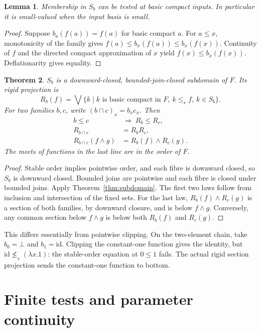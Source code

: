 \documentclass[11pt]{article}
\newtheorem{theorem}{Theorem}[section]
\newtheorem{lemma}[theorem]{Lemma}
\newcommand{\id}{\mathrm{id}}
\begin{document}
\begin{lemma}
Membership in $S_b$ can be tested at basic compact inputs. In particular
it is small-valued when the input basis is small.
\end{lemma}
\begin{proof}
Suppose $b_a(f(a))=f(a)$ for basic compact $a$. For $a\le x$,
monotonicity of the family gives $f(a)\le b_x(f(a))\le b_x(f(x))$.
Continuity of $f$ and the directed compact approximation of $x$ yield
$f(x)\le b_x(f(x))$. Deflationarity gives equality.
\end{proof}

\begin{theorem}
$S_b$ is a downward-closed, bounded-join-closed subdomain of $F$.
Its rigid projection is
\[
 R_b(f)=\bigvee\{k\mid k\text{ is basic compact in }F,
                         \ k\le_s f,\ k\in S_b\}.
\]
For two families $b,c$, write $(b\cap c)_x=b_xc_x$. Then
\begin{align*}
 b\le c&\ \Longrightarrow\ R_b\le R_c,\\
 R_{b\cap c}&=R_bR_c,\\
 R_{b\cap c}(f\wedge g)&=R_b(f)\wedge R_c(g).
\end{align*}
The meets of functions in the last line are in the order of $F$.
\end{theorem}
\begin{proof}
Stable order implies pointwise order, and each fibre is downward closed,
so $S_b$ is downward closed. Bounded joins are pointwise and each fibre
is closed under bounded joins. Apply Theorem~\ref{thm:subdomain}.
The first two laws follow from inclusion and intersection of the fixed
sets. For the last law, $R_b(f)\wedge R_c(g)$ is a section of both
families, by downward closure, and is below $f\wedge g$. Conversely,
any common section below $f\wedge g$ is below both $R_b(f)$ and $R_c(g)$.
\end{proof}

This differs essentially from pointwise clipping. On the two-element
chain, take $b_0=\bot$ and $b_1=\id$. Clipping the constant-one function
gives the identity, but $\id\not\le_s(\lambda x.1)$: the stable-order
equation at $0\le1$ fails. The actual rigid section projection sends
the constant-one function to bottom.

\section{Finite tests and parameter continuity}
\end{document}
